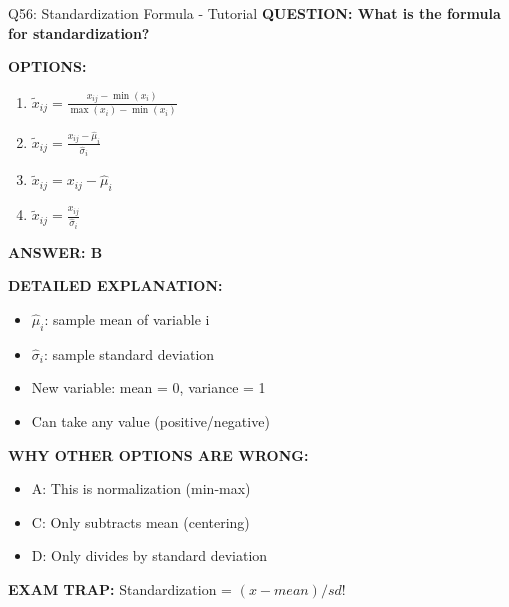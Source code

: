 \documentclass[8pt]{beamer}
\begin{document}
	\begin{frame}{Q56: Standardization Formula - Tutorial}
		\fontsize{6.5}{7.5}\selectfont
		\textbf{QUESTION: What is the formula for standardization?}
		
		\vspace{0.1cm}
		\textbf{OPTIONS:}
		\begin{enumerate}
			\item $\tilde{x}_{ij} = \frac{x_{ij} - \min(x_i)}{\max(x_i) - \min(x_i)}$
			\item $\tilde{x}_{ij} = \frac{x_{ij} - \hat{\mu}_i}{\hat{\sigma}_i}$
			\item $\tilde{x}_{ij} = x_{ij} - \hat{\mu}_i$
			\item $\tilde{x}_{ij} = \frac{x_{ij}}{\hat{\sigma}_i}$
		\end{enumerate}
		
		\vspace{0.1cm}
		\textcolor{myblue}{\textbf{ANSWER: B}}
		
		\vspace{0.1cm}
		\textbf{DETAILED EXPLANATION:}
		\begin{itemize}
			\item $\hat{\mu}_i$: sample mean of variable i
			\item $\hat{\sigma}_i$: sample standard deviation
			\item New variable: mean = 0, variance = 1
			\item Can take any value (positive/negative)
		\end{itemize}
		
		\vspace{0.1cm}
		\textcolor{myred}{\textbf{WHY OTHER OPTIONS ARE WRONG:}}
		\begin{itemize}
			\item \textcolor{myred}{A:} This is normalization (min-max)
			\item \textcolor{myred}{C:} Only subtracts mean (centering)
			\item \textcolor{myred}{D:} Only divides by standard deviation
		\end{itemize}
		
		\textcolor{myred}{\textbf{EXAM TRAP:}} Standardization = \textcolor{myblue}{$(x - mean) / sd$}!
	\end{frame}
	
\end{document}
